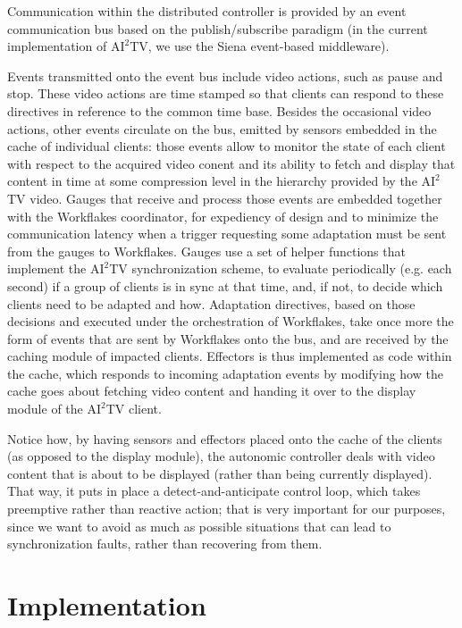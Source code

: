 \documentclass{sig-alternate}
\begin{document}
Communication within the distributed controller is provided by an
event communication bus based on the publish/subscribe paradigm (in
the current implementation of $\mathrm{AI}^2$TV, we use the
Siena\cite{Siena} event-based middleware).

Events transmitted onto the event bus include video actions, such as
pause and stop.  These video actions are time stamped so that clients
can respond to these directives in reference to the common time base.
Besides the occasional video actions, other events circulate on the
bus, emitted by sensors embedded in the cache of individual clients:
those events allow to monitor the state of each client with respect to
the acquired video conent and its ability to fetch and display that
content in time at some compression level in the hierarchy provided by
the $\mathrm{AI}^2$TV video.
%
Gauges that receive and process those events are embedded together
with the Workflakes coordinator, for expediency of design and to
minimize the communication latency when a trigger requesting some
adaptation must be sent from the gauges to Workflakes.  Gauges use a
set of helper functions that implement the $\mathrm{AI}^2$TV
synchronization scheme, to evaluate periodically (e.g. each second) if
a group of clients is in sync at that time, and, if not, to decide
which clients need to be adapted and how.  Adaptation directives,
based on those decisions and executed under the orchestration of
Workflakes, take once more the form of events that are sent by
Workflakes onto the bus, and are received by the caching module of
impacted clients.  Effectors is thus implemented as code within the
cache, which responds to incoming adaptation events by modifying how
the cache goes about fetching video content and handing it over to the
display module of the $\mathrm{AI}^2$TV client.

Notice how, by having sensors and effectors placed onto the cache of
the clients (as opposed to the display module), the autonomic
controller deals with video content that is about to be displayed
(rather than being currently displayed). That way, it puts in place a
detect-and-anticipate control loop, which takes preemptive rather than
reactive action; that is very important for our purposes, since we
want to avoid as much as possible situations that can lead to
synchronization faults, rather than recovering from them.

\section{Implementation} \label{implementation}
\end{document}
